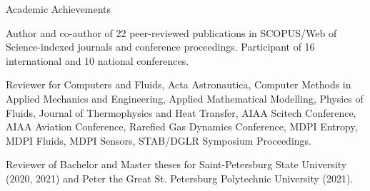\documentclass{resume} %
\begin{document}
\begin{rSection}{Academic Achievements}

Author and co-author of 22 peer-reviewed publications in SCOPUS/Web of Science-indexed  journals and conference proceedings.
Participant of 16 international and 10 national conferences.

Reviewer for Computers and Fluids, Acta Astronautica, Computer Methods in Applied Mechanics and Engineering, Applied Mathematical Modelling, Physics of Fluids, Journal of Thermophysics and Heat Transfer, AIAA Scitech Conference, AIAA Aviation Conference, Rarefied Gas Dynamics Conference,  MDPI Entropy, MDPI Fluids, MDPI Sensors, STAB/DGLR Symposium Proceedings.

Reviewer of Bachelor and Master theses for Saint-Petersburg State University (2020, 2021) and Peter the Great St. Petersburg Polytechnic University (2021).







\end{rSection}
\end{document}
